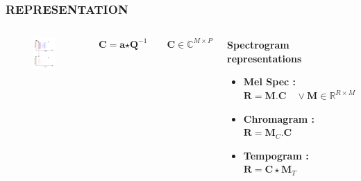 \documentclass{beamer}
\begin{document}
\begin{frame}
\frametitle{REPRESENTATION}
\begin{columns}[c]
\begin{figure}
\includegraphics[width=\textwidth]{rep_2}
\end{figure}
\[
\textbf{C} = \textbf{a} \bm{\star} \textbf{Q}^{-1} \qquad \textbf{C} \in \mathbb{C}^{M \times P}
\]
\begin{block}{\textbf{Spectrogram representations}}
\begin{itemize}
\item \textbf{Mel Spec :}  \\ $\textbf{R} = \textbf{M}. \textbf{C} \quad \vee \textbf{M} \in \mathbb{R}^{R \times M}$
\item \textbf{Chromagram :}\\$\textbf{R} = \textbf{M}_{C}. \textbf{C}$
\item \textbf{Tempogram :}\\$\textbf{R} = \textbf{C} \star \textbf{M}_{T}$  
\end{itemize}
\end{block}
\end{columns}
\end{frame}
\end{document}
